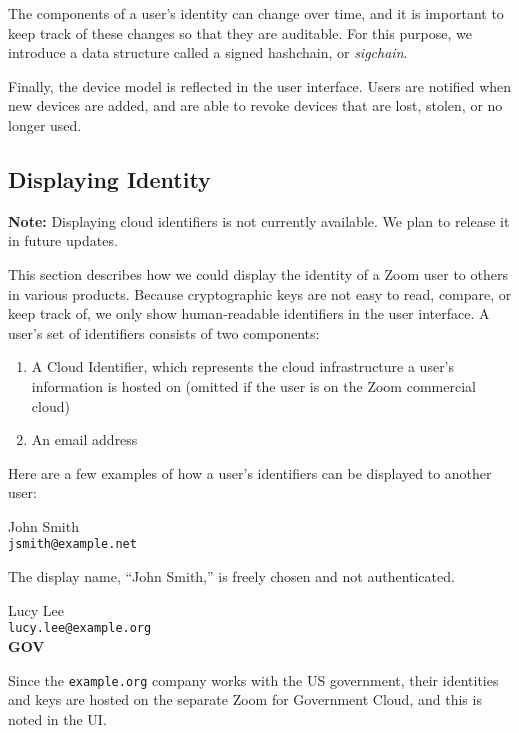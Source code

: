 The components of a user's identity can change over time, and it is important to keep track of these
changes so that they are auditable. For this purpose, we introduce a data structure called a signed
hashchain, or \textit{sigchain}.

Finally, the device model is reflected in the user interface. Users are notified when new devices
are added, and are able to revoke devices that are lost, stolen, or no longer used.

\subsection{Displaying Identity}
\label{subsec:displayid}

\textbf{Note:} Displaying cloud identifiers is not currently available. We plan to release it in
future updates.

This section describes how we could display the identity of a Zoom user to others in various
products. Because cryptographic keys are not easy to read, compare, or keep track of, we only show
human-readable identifiers in the user interface. A user's set of identifiers consists of two
components:

\begin{enumerate}
\item A Cloud Identifier, which represents the cloud infrastructure a user's information is hosted
on (omitted if the user is on the Zoom commercial cloud)
\item
    An email address
\end{enumerate}

Here are a few examples of how a user's identifiers can be displayed to another user:

\begin{multicols}{2}
John Smith \\
\texttt{jsmith@example.net}

\columnbreak

The display name, ``John Smith,'' is freely chosen and not authenticated.
\end{multicols}

\begin{multicols}{2}
Lucy Lee \\
\texttt{lucy.lee@example.org} \\ \textbf{GOV}

\columnbreak

Since the \texttt{example.org} company works with the US government, their identities and keys are
hosted on the separate Zoom for Government Cloud, and this is noted in the UI.
\end{multicols}

